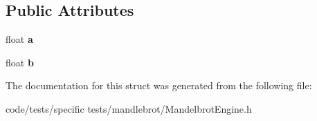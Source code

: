 \subsection*{Public Attributes}
\begin{DoxyCompactItemize}
\item 
\hypertarget{struct_complex_number_af3301b57393f5ec49dc20656abd21577}{float {\bfseries a}}\label{struct_complex_number_af3301b57393f5ec49dc20656abd21577}

\item 
\hypertarget{struct_complex_number_ad30f58bdce8a1352cec246585a4cf0ee}{float {\bfseries b}}\label{struct_complex_number_ad30f58bdce8a1352cec246585a4cf0ee}

\end{DoxyCompactItemize}


The documentation for this struct was generated from the following file\-:\begin{DoxyCompactItemize}
\item 
code/tests/specific tests/mandlebrot/Mandelbrot\-Engine.\-h\end{DoxyCompactItemize}
